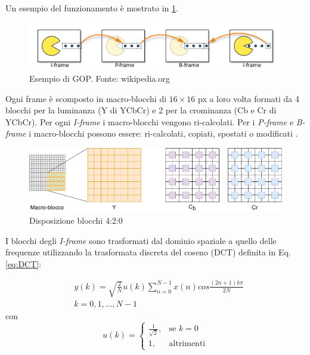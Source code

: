 Un esempio del funzionamento è mostrato in \ref{fig:I_P_and_B_frames}.

\begin{figure}[H]
	\includegraphics[width=\linewidth]{immagini/I_P_and_B_frames}
	\caption{Esempio di GOP. Fonte: wikipedia.org}
	\label{fig:I_P_and_B_frames}
\end{figure}

Ogni frame è scomposto in macro-blocchi di $16\times16$ px a loro volta formati da 4 blocchi per la luminanza (Y di YCbCr) e 2 per la crominanza (Cb e Cr di YCbCr). Per ogni \textit{I-frame} i macro-blocchi vengono ri-calcolati. Per i \textit{P-frame} e \textit{B-frame} i macro-blocchi possono essere: ri-calcolati, copiati, spostati o modificati \parencite{MPEG_1_Video}.

\begin{figure}[H]
	\includegraphics[width=\linewidth]{immagini/macroblocchi}
	\centering
	\caption{Disposizione blocchi 4:2:0}
	\label{fig:macroblocchi}
\end{figure}

I blocchi degli \textit{I-frame} sono trasformati dal dominio spaziale a quello delle frequenze utilizzando la trasformata discreta del coseno (DCT) definita in Eq. \ref{eq:DCT}:

\begin{equation} \label{eq:DCT}
	\begin{aligned}
		& y(k) = \sqrt{\frac{2}{N}} u(k) \sum_{n=0}^{N-1} x(n) cos \frac{(2n+1)k\pi}{2N} \\
		& k = 0, 1, \dots, N-1	
	\end{aligned}
\end{equation}
con
\begin{equation} \label{eq:u_k}
	u(k)=  
	\begin{cases}
		\frac{1}{\sqrt{2}},	& \text{se } k=0\\
		1,					& \text{altrimenti}
	\end{cases}	
\end{equation}

